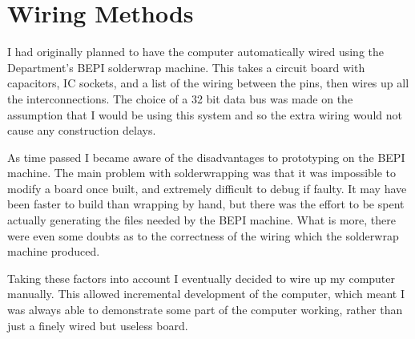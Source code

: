 \section{Wiring Methods}

I had originally planned to have the   computer automatically  wired using the Department's BEPI solderwrap machine. 
This  takes a circuit board with capacitors, IC sockets, and a list of the wiring between the pins,  then wires up all the interconnections. 
The choice of a 32 bit data bus was made on the assumption that I would be using this system and so the extra wiring would not cause any construction delays.


As time passed I became aware of the disadvantages to prototyping on the BEPI machine.
The main problem with  solderwrapping  was that it was impossible to modify a board once built, and extremely difficult to debug if faulty. 
It may have been  faster to build than wrapping by hand, but there was the effort to be  spent actually generating the files needed by the BEPI 
machine.
What is more, there were even some doubts as to the correctness of the wiring which the solderwrap machine produced.

Taking these factors into account I eventually decided to wire up my computer
manually. This allowed incremental development of the computer, which 
meant I was always  able to demonstrate some part of the computer 
working, rather than just a finely wired but useless board.


